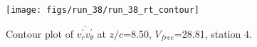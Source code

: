 \begin{figure}[H]
\centering
\texttt{[image: figs/run\_38/run\_38\_rt\_contour]}
\caption{Contour plot of $\overline{v_{r}^{\prime} v_{\theta}^{\prime}}$ at $z/c$=8.50, $V_{free}$=28.81, station 4.}
\label{fig:run_38_rt_contour}
\end{figure}



